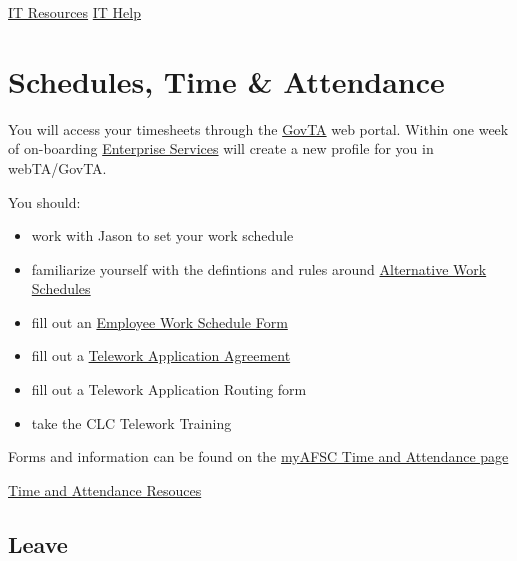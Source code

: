 \documentclass[
  letterpaper,
  DIV=11,
  numbers=noendperiod]{scrreprt}
\providecommand{\tightlist}{%
  \setlength{\itemsep}{0pt}\setlength{\parskip}{0pt}}\usepackage{longtable,booktabs,array}
\begin{document}
\href{https://sites.google.com/noaa.gov/myafsc/technology}{IT Resources}
\href{https://sites.google.com/noaa.gov/myafsc/technology/afsc-it-service-desk}{IT
Help}

\hypertarget{schedules-time-attendance}{%
\section{Schedules, Time \&
Attendance}\label{schedules-time-attendance}}

You will access your timesheets through the
\href{https://docwebta.eas.commerce.gov/webta/}{GovTA} web portal.
Within one week of on-boarding
\href{https://enterpriseservices.servicenowservices.com/es}{Enterprise
Services} will create a new profile for you in webTA/GovTA.

You should:

\begin{itemize}
\tightlist
\item
  work with Jason to set your work schedule\\
\item
  familiarize yourself with the defintions and rules around
  \href{https://drive.google.com/file/d/1VlxkCEHZEdQd2pfGu9Bud5QZDUudqioa/view?pli=1}{Alternative
  Work Schedules}\\
\item
  fill out an
  \href{https://drive.google.com/file/d/1SvyTE2M6lQ0dcX5w3b0f7CJNxU6zDFDy/view?usp=share_link}{Employee
  Work Schedule Form}\\
\item
  fill out a
  \href{https://drive.google.com/file/d/19oABvmjMgRX4az-9U1Ijgd3ux5BwmHQw/view}{Telework
  Application Agreement}\\
\item
  fill out a Telework Application Routing form
\item
  take the CLC Telework Training
\end{itemize}

Forms and information can be found on the
\href{https://sites.google.com/noaa.gov/myafsc/administrative/time-and-attendance}{myAFSC
Time and Attendance page}

\href{https://sites.google.com/noaa.gov/myafsc/administrative/time-and-attendance}{Time
and Attendance Resouces}

\hypertarget{leave}{%
\subsection{Leave}\label{leave}}
\end{document}
